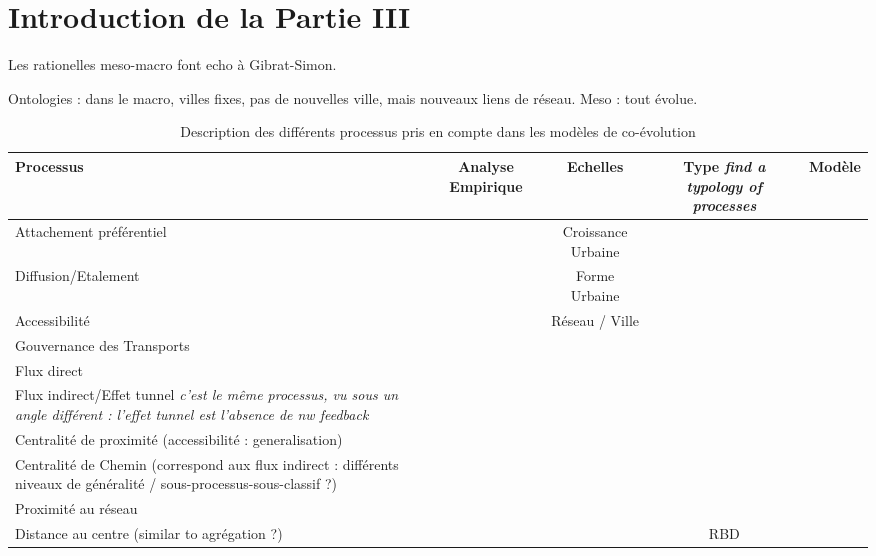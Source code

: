 



\chapter*{Introduction de la Partie III}









Les rationelles meso-macro font echo à Gibrat-Simon.

Ontologies : dans le macro, villes fixes, pas de nouvelles ville, mais nouveaux liens de réseau. Meso : tout évolue.







\begin{table}
\begin{tabular}[6pt]{m{4cm}|c|c|c|c}
Processus & Analyse Empirique & Echelles & Type \textit{find a typology of processes} & Modèle \\\hline
Attachement préférentiel & & Croissance Urbaine & & \\\hline
Diffusion/Etalement & & Forme Urbaine & &\\\hline
Accessibilité  & & Réseau / Ville & & \\\hline
Gouvernance des Transports & & & &\\\hline
Flux direct  & & & &\\\hline
Flux indirect/Effet tunnel \textit{c'est le même processus, vu sous un angle différent : l'effet tunnel est l'absence de nw feedback} & & & &\\\hline
Centralité de proximité (accessibilité : generalisation) & & & &\\\hline
Centralité de Chemin (correspond aux flux indirect : différents niveaux de généralité / sous-processus-sous-classif ?) & & & &\\\hline
Proximité au réseau & & & &\\\hline
Distance au centre (similar to agrégation ?) & & & RBD &\\\hline
\end{tabular}
\caption{Description des différents processus pris en compte dans les modèles de co-évolution}{}
\end{table}



